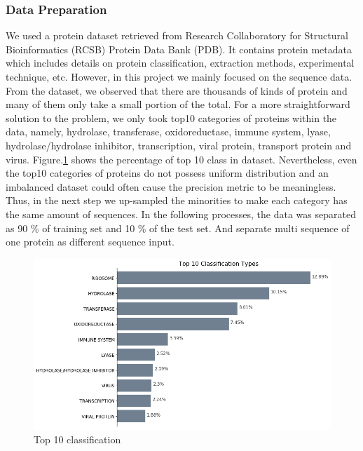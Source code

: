 \documentclass[sigconf]{acmart}
\begin{document}
\subsubsection{Data Preparation}
We used a protein dataset retrieved from Research Collaboratory for Structural Bioinformatics (RCSB) Protein Data Bank (PDB). It contains protein metadata which includes details on protein classification, extraction methods, experimental technique, etc. However, in this project we mainly focused on the sequence data. From the dataset, we observed that there are thousands of kinds of protein and many of them only take a small portion of the total. For a more straightforward solution to the problem, we only took top10 categories of proteins within the data, namely, hydrolase, transferase, oxidoreductase, immune system, lyase, hydrolase/hydrolase inhibitor, transcription, viral protein, transport protein and virus. Figure.\ref{3} shows the percentage of top 10 class in dataset. Nevertheless, even the top10 categories of proteins do not possess uniform distribution and an imbalanced dataset could often cause the precision metric to be meaningless\cite{chawla2004special}. Thus, in the next step we up-sampled the minorities to make each category has the same amount of sequences. In the following processes, the data was separated as 90 \% of training set and 10 \% of the test set. And separate multi sequence of one protein as different sequence input.
\begin{figure}
  \centering
  \includegraphics[width=\linewidth]{3.png}
  \caption{Top 10 classification}
  \label{3}
\end{figure}
\end{document}
